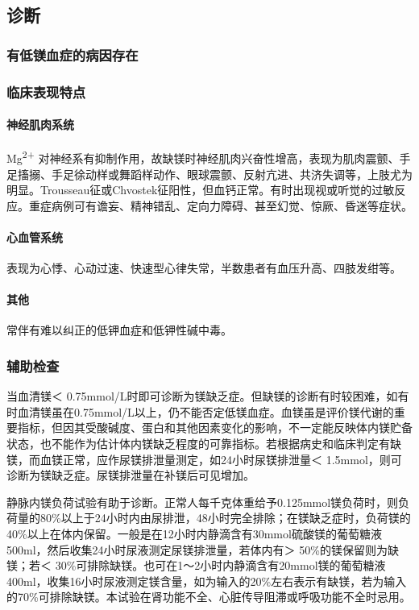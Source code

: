 \subsection{诊断}

\subsubsection{有低镁血症的病因存在}

\subsubsection{临床表现特点}

\paragraph{神经肌肉系统}

Mg\textsuperscript{2+}
对神经系有抑制作用，故缺镁时神经肌肉兴奋性增高，表现为肌肉震颤、手足搐搦、手足徐动样或舞蹈样动作、眼球震颤、反射亢进、共济失调等，上肢尤为明显。Trousseau征或Chvostek征阳性，但血钙正常。有时出现视或听觉的过敏反应。重症病例可有谵妄、精神错乱、定向力障碍、甚至幻觉、惊厥、昏迷等症状。

\paragraph{心血管系统}

表现为心悸、心动过速、快速型心律失常，半数患者有血压升高、四肢发绀等。

\paragraph{其他}

常伴有难以纠正的低钾血症和低钾性碱中毒。

\subsubsection{辅助检查}

当血清镁＜
0.75mmol/L时即可诊断为镁缺乏症。但缺镁的诊断有时较困难，如有时血清镁虽在0.75mmol/L以上，仍不能否定低镁血症。血镁虽是评价镁代谢的重要指标，但因其受酸碱度、蛋白和其他因素变化的影响，不一定能反映体内镁贮备状态，也不能作为估计体内镁缺乏程度的可靠指标。若根据病史和临床判定有缺镁，而血镁正常，应作尿镁排泄量测定，如24小时尿镁排泄量＜
1.5mmol，则可诊断为镁缺乏症。尿镁排泄量在补镁后可见增加。

静脉内镁负荷试验有助于诊断。正常人每千克体重给予0.125mmol镁负荷时，则负荷量的80\%以上于24小时内由尿排泄，48小时完全排除；在镁缺乏症时，负荷镁的40\%以上在体内保留。一般是在12小时内静滴含有30mmol硫酸镁的葡萄糖液500ml，然后收集24小时尿液测定尿镁排泄量，若体内有＞
50\%的镁保留则为缺镁；若＜
30\%可排除缺镁。也可在1～2小时内静滴含有20mmol镁的葡萄糖液400ml，收集16小时尿液测定镁含量，如为输入的20\%左右表示有缺镁，若为输入的70\%可排除缺镁。本试验在肾功能不全、心脏传导阻滞或呼吸功能不全时忌用。

